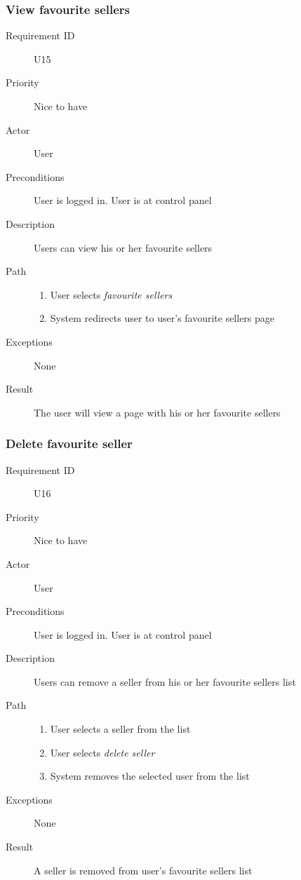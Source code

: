 		\subsubsection{View favourite sellers}
			\begin{description}
				\item[Requirement ID] U15
				\item[Priority] Nice to have
				\item[Actor] User
				\item[Preconditions] User is logged in. User is at control panel
				\item[Description] Users can view his or her favourite sellers
				\item[Path]
 					\begin{enumerate}
						\item User selects \emph{favourite sellers}
						\item System redirects user to user's favourite sellers page
					\end{enumerate}
				\item[Exceptions] None
				\item[Result] The user will view a page with his or her favourite sellers
			\end{description}
		\subsubsection{Delete favourite seller}
			\begin{description}
				\item[Requirement ID] U16
				\item[Priority] Nice to have
				\item[Actor] User
				\item[Preconditions] User is logged in. User is at control panel
				\item[Description] Users can remove a seller from his or her favourite sellers list
				\item[Path]
 					\begin{enumerate}
						\item User selects a seller from the list
						\item User selects \emph{delete seller} 
						\item System removes the selected user from the list
					\end{enumerate}
				\item[Exceptions] None
				\item[Result] A seller is removed from user's favourite sellers list
			\end{description}
